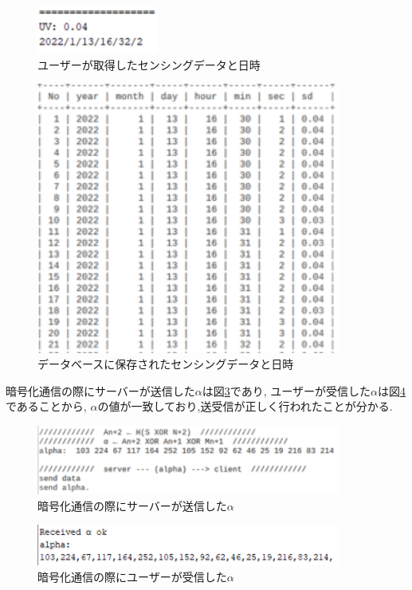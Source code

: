 \begin{figure}[H]
\begin{center}
	\includegraphics[width=4cm]{ango_uv_sd.png}
	\caption{ユーザーが取得したセンシングデータと日時}
	\label{fig:ango_uv_sd}
\end{center}
\end{figure}
\begin{figure}[H]
\begin{center}
	\includegraphics[width=10cm]{ango_server_sd.png}
	\caption{データベースに保存されたセンシングデータと日時}
	\label{fig:ango_server_sd}
\end{center}
\end{figure}

暗号化通信の際にサーバーが送信した$\alpha$は図\ref{fig:ango_server_alpha}であり,
ユーザーが受信した$\alpha$は図\ref{fig:ango_uv_alpha}であることから,
$\alpha$の値が一致しており,送受信が正しく行われたことが分かる.

\begin{figure}[H]
\begin{center}
	\includegraphics[width=10cm]{ango_server_alpha.png}
	\caption{暗号化通信の際にサーバーが送信した$\alpha$}
	\label{fig:ango_server_alpha}
\end{center}
\end{figure}
\begin{figure}[H]
\begin{center}
	\includegraphics[width=10cm]{ango_uv_alpha.png}
	\caption{暗号化通信の際にユーザーが受信した$\alpha$}
	\label{fig:ango_uv_alpha}
\end{center}
\end{figure}

